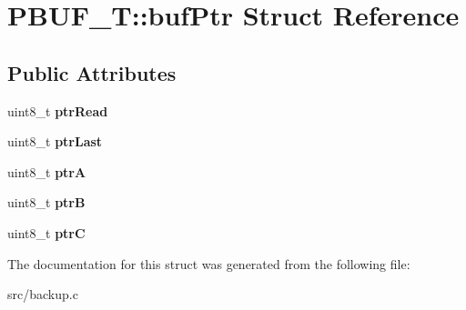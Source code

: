 \hypertarget{structPBUF__T_1_1bufPtr}{}\section{P\+B\+U\+F\+\_\+T\+:\+:buf\+Ptr Struct Reference}
\label{structPBUF__T_1_1bufPtr}
\subsection*{Public Attributes}
\begin{DoxyCompactItemize}
\item 
\mbox{\label{structPBUF__T_1_1bufPtr_a7003144cb6cb298cb0df727373e193bb}} 
uint8\+\_\+t {\bfseries ptr\+Read}
\item 
\mbox{\label{structPBUF__T_1_1bufPtr_aab93b5352a17270b99b99a1402143010}} 
uint8\+\_\+t {\bfseries ptr\+Last}
\item 
\mbox{\label{structPBUF__T_1_1bufPtr_affe3488ff0a4be955080bb30ed60b07e}} 
uint8\+\_\+t {\bfseries ptrA}
\item 
\mbox{\label{structPBUF__T_1_1bufPtr_a3ada4b9b8539255b72f4e5585cf1fef5}} 
uint8\+\_\+t {\bfseries ptrB}
\item 
\mbox{\label{structPBUF__T_1_1bufPtr_a1ec0eec489fe620e5be07d72a6096fae}} 
uint8\+\_\+t {\bfseries ptrC}
\end{DoxyCompactItemize}


The documentation for this struct was generated from the following file\+:\begin{DoxyCompactItemize}
\item 
src/backup.\+c\end{DoxyCompactItemize}
